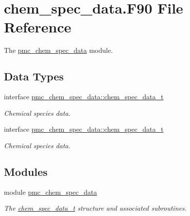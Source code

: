 \hypertarget{chem__spec__data_8_f90}{}\section{chem\+\_\+spec\+\_\+data.\+F90 File Reference}
\label{chem__spec__data_8_f90}


The \mbox{\hyperlink{namespacepmc__chem__spec__data}{pmc\+\_\+chem\+\_\+spec\+\_\+data}} module.  


\subsection*{Data Types}
\begin{DoxyCompactItemize}
\item 
interface \mbox{\hyperlink{structpmc__chem__spec__data_1_1chem__spec__data__t}{pmc\+\_\+chem\+\_\+spec\+\_\+data\+::chem\+\_\+spec\+\_\+data\+\_\+t}}
\begin{DoxyCompactList}\small\item\em Chemical species data. \end{DoxyCompactList}\item 
interface \mbox{\hyperlink{structpmc__chem__spec__data_1_1chem__spec__data__t}{pmc\+\_\+chem\+\_\+spec\+\_\+data\+::chem\+\_\+spec\+\_\+data\+\_\+t}}
\begin{DoxyCompactList}\small\item\em Chemical species data. \end{DoxyCompactList}\end{DoxyCompactItemize}
\subsection*{Modules}
\begin{DoxyCompactItemize}
\item 
module \mbox{\hyperlink{namespacepmc__chem__spec__data}{pmc\+\_\+chem\+\_\+spec\+\_\+data}}
\begin{DoxyCompactList}\small\item\em The \mbox{\hyperlink{structpmc__chem__spec__data_1_1chem__spec__data__t}{chem\+\_\+spec\+\_\+data\+\_\+t}} structure and associated subroutines. \end{DoxyCompactList}\end{DoxyCompactItemize}
